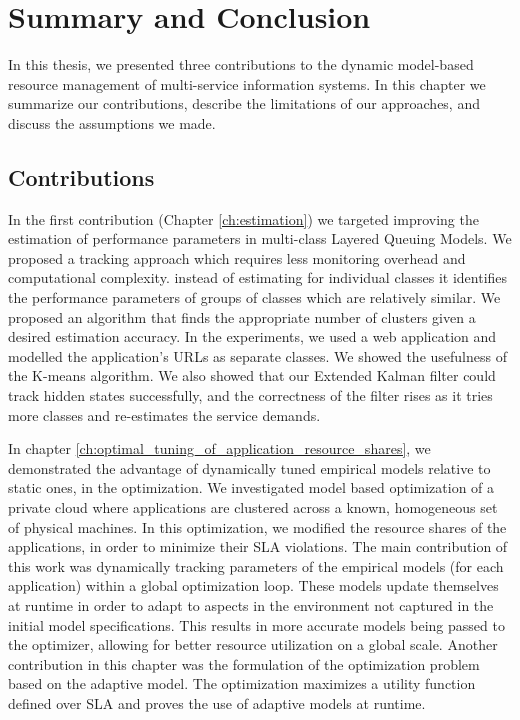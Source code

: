\chapter{Summary and Conclusion}
\label{ch:conclusion}
In this thesis, we presented three contributions to the dynamic model-based resource management of multi-service information systems. 
 In this chapter we summarize our contributions, describe the limitations of our approaches, and discuss the assumptions we made. 

\section{Contributions}
In the first contribution (Chapter \ref{ch:estimation}) we targeted improving the estimation of performance parameters in multi-class Layered Queuing Models. 
We proposed a tracking approach which requires less monitoring overhead and computational complexity.  instead of estimating for individual classes it identifies the performance parameters of groups of classes which are relatively similar. We proposed an algorithm that finds the appropriate number of clusters given a desired estimation accuracy. 
In the experiments, we used a web application and modelled the application's URLs as separate classes.  We showed the usefulness of the K-means algorithm. We also showed that our Extended Kalman filter could track hidden states successfully, and the correctness of the filter rises as it tries more classes and re-estimates the service demands.

In chapter \ref{ch:optimal_tuning_of_application_resource_shares}, we demonstrated the advantage of dynamically tuned empirical models relative to static ones, in the optimization. We investigated model based optimization of a private cloud where applications are clustered across a known, homogeneous set of physical machines. In this optimization, we modified the resource shares of the applications, in order to minimize their SLA violations. The main contribution of this work was dynamically tracking parameters of the empirical models (for each application) within a global optimization loop. These models update themselves at runtime in order to adapt to aspects in the environment not captured in the initial model specifications. This results in more accurate models being passed to the optimizer, allowing for better resource utilization on a global scale.  
Another contribution in this chapter was the formulation of the optimization problem based on the adaptive model. The optimization maximizes a utility function defined over SLA and proves the use of adaptive models at runtime.  

